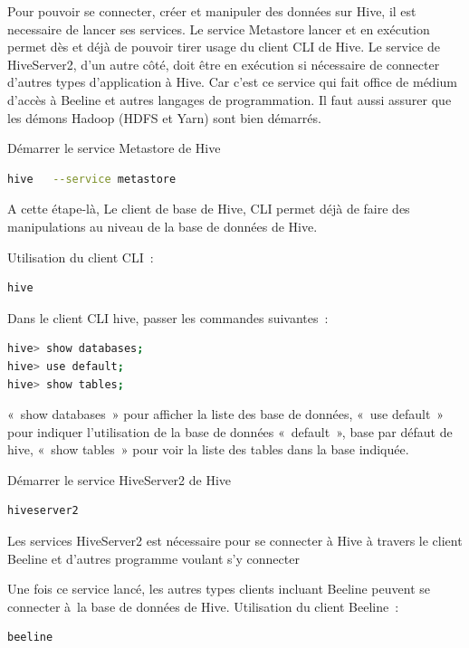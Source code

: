 \documentclass[12pt,french]{book}
\begin{document}
Pour pouvoir se connecter, créer et manipuler des données sur Hive, il est necessaire de lancer ses services. Le service Metastore lancer et en exécution permet dès et déjà de pouvoir tirer usage du client CLI de Hive.  Le service de HiveServer2, d'un autre côté, doit être en exécution si nécessaire de connecter d’autres types d’application à Hive.  Car c’est ce service qui fait office de médium d’accès à Beeline et autres langages de programmation. Il faut aussi assurer que les démons Hadoop (HDFS et Yarn) sont bien démarrés.

Démarrer le service Metastore de Hive

\begin{lstlisting}[language=bash, frame=single]
hive   --service metastore
\end{lstlisting}

A cette étape-là, Le client de base de Hive, CLI permet déjà de faire des manipulations au niveau de la base de données de Hive.

Utilisation du client CLI :
\begin{lstlisting}[language=bash, frame=single]
hive 
\end{lstlisting}

Dans le client CLI hive, passer les commandes suivantes :

\begin{lstlisting}[language=bash, frame=single]
hive> show databases;
hive> use default;
hive> show tables;
\end{lstlisting}

« show databases » pour afficher la liste des base de données, « use default » pour indiquer l’utilisation de la base de données « default », base par défaut  de hive, « show tables » pour voir la liste des tables dans la base indiquée.

Démarrer le service HiveServer2 de Hive

\begin{lstlisting}[language=bash, frame=single]
hiveserver2
\end{lstlisting}

Les services HiveServer2 est nécessaire pour se connecter à Hive à travers le client Beeline et d’autres programme voulant s’y connecter

Une fois ce service lancé, les autres types clients incluant Beeline peuvent se connecter à la base de données de Hive.
Utilisation du client Beeline :

\begin{lstlisting}[language=bash, frame=single]
beeline
\end{lstlisting}
\end{document}
